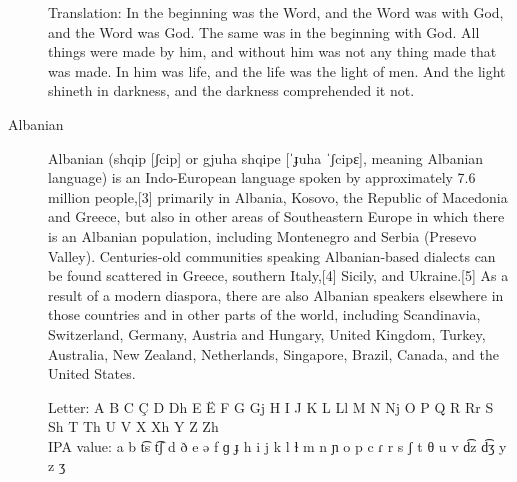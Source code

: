 \begin{description}
Translation: In the beginning was the Word, and the Word was with God, and the Word was God. The same was in the beginning with God. All things were made by him, and without him was not any thing made that was made. In him was life, and the life was the light of men. And the light shineth in darkness, and the darkness comprehended it not.

\item[Albanian]Albanian (shqip [ʃcip] or gjuha shqipe [ˈɟuha ˈʃcipɛ], meaning Albanian language) is an Indo-European language spoken by approximately 7.6 million people,[3] primarily in Albania, Kosovo, the Republic of Macedonia and Greece, but also in other areas of Southeastern Europe in which there is an Albanian population, including Montenegro and Serbia (Presevo Valley). Centuries-old communities speaking Albanian-based dialects can be found scattered in Greece, southern Italy,[4] Sicily, and Ukraine.[5] As a result of a modern diaspora, there are also Albanian speakers elsewhere in those countries and in other parts of the world, including Scandinavia, Switzerland, Germany, Austria and Hungary, United Kingdom, Turkey, Australia, New Zealand, Netherlands, Singapore, Brazil, Canada, and the United States.

Letter:	A	B	C	Ç	D	Dh	E	Ë	F	G	Gj	H	I	J	K	L	Ll	M	N	Nj	O	P	Q	R	Rr	S	Sh	T	Th	U	V	X	Xh	Y	Z	Zh\\
IPA value:	a	b	t͡s	t͡ʃ	d	ð	e	ə	f	ɡ	ɟ	h	i	j	k	l	ɫ	m	n	ɲ	o	p	c	ɾ	r	s	ʃ	t	θ	u	v	d͡z	d͡ʒ	y	z	ʒ\\

\end{description}

